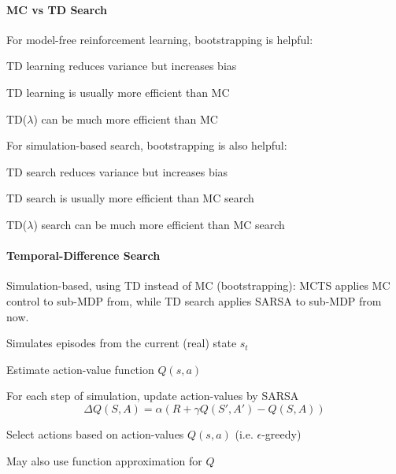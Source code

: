 \documentclass[10pt]{report}
\begin{document}
\paragraph{MC vs TD Search} For model-free reinforcement learning, bootstrapping is helpful:
\begin{list}{}{}
	\item TD learning reduces variance but increases bias
	\item TD learning is usually more efficient than MC
	\item TD($\lambda$) can be much more efficient than MC
\end{list}
For simulation-based search, bootstrapping is also helpful:
\begin{list}{}{}
	\item TD search reduces variance but increases bias
	\item TD search is usually more efficient than MC search
	\item TD($\lambda$) search can be much more efficient than MC search
\end{list}
\paragraph{Temporal-Difference Search} Simulation-based, using TD instead of MC (bootstrapping): MCTS applies MC control to sub-MDP from, while TD search applies SARSA to sub-MDP from now.
\begin{list}{}{}
	\item Simulates episodes from the current (real) state $s_t$
	\item Estimate action-value function $Q(s,a)$
	\item For each step of simulation, update action-values by SARSA
	$$\Delta Q(S,A)=\alpha(R+\gamma Q(S',A') - Q(S,A))$$
	\item Select actions based on action-values $Q(s,a)$ (i.e. $\epsilon$-greedy)
	\item May also use function approximation for $Q$
\end{list}
\pagebreak
\end{document}
